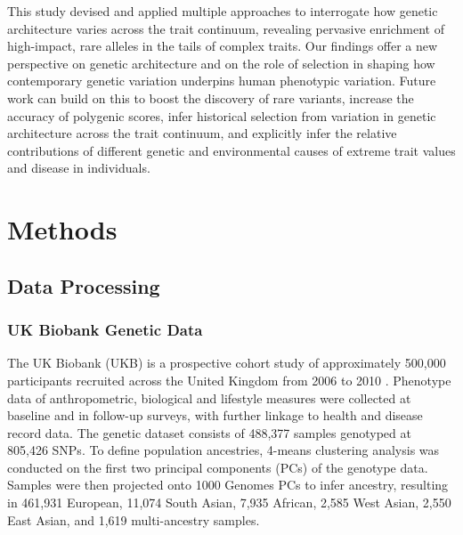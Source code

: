 \documentclass[12pt]{zHenriquesLab-StyleBioRxiv}
\begin{document}
This study devised and applied multiple approaches to interrogate how genetic architecture 
varies across the trait continuum, revealing pervasive enrichment of high-impact, 
rare alleles in the tails of complex traits. Our findings offer a new perspective on 
genetic architecture and on the role of selection in shaping how contemporary genetic 
variation underpins human phenotypic variation. Future work can build on this to boost 
the discovery of rare variants, increase the accuracy of polygenic scores, infer historical 
selection from variation in genetic architecture across the trait continuum, 
and explicitly infer the relative contributions of different genetic and environmental 
causes of extreme trait values and disease in individuals.
%
%
%
%
%
%
%
%
%
%
%
%
%
%
%
%
%
%
%
%
%
%
%
%
%
%
%
%
%
%
%
%
%
%
%
%
%
%
%
%
%
%
%
%
\clearpage \newpage 
\section*{Methods} \label{sec:methods} 
\subsection*{Data Processing} \label{sec:methods:dataProcessing}
\subsubsection*{UK Biobank Genetic Data} 
The UK Biobank (UKB) is a prospective cohort study of approximately
500,000 participants recruited across the United Kingdom from 2006 to
2010 \citep{ukb}. Phenotype data of anthropometric, biological and
lifestyle measures were collected at baseline and in follow-up surveys, with
further linkage to health and disease record data. The genetic dataset
consists of 488,377 samples genotyped at 805,426 SNPs.
To define population ancestries, 4-means clustering analysis was
conducted on the first two principal components (PCs) of the genotype
data. Samples were then projected onto 1000 Genomes PCs to infer
ancestry, resulting in 461,931 European, 11,074 South Asian, 7,935
African, 2,585 West Asian, 2,550 East Asian, and 1,619 multi-ancestry
samples.
\end{document}

